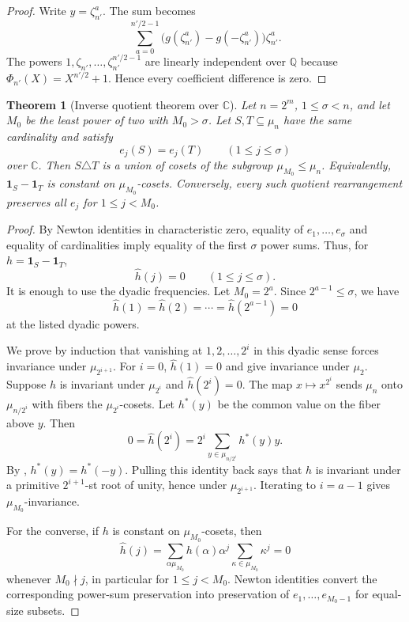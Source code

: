 \documentclass[11pt]{article}
\newtheorem{theorem}{Theorem}[section]
\theoremstyle{definition}
\newcommand{\Q}{\mathbb Q}
\newcommand{\C}{\mathbb C}
\begin{document}
\begin{proof}
Write $y=\zeta_{n'}^a$.  The sum becomes
\[
        \sum_{a=0}^{n'/2-1}\big(g(\zeta_{n'}^a)-g(-\zeta_{n'}^a)\big)\zeta_{n'}^a.
\]
The powers $1,\zeta_{n'},\ldots,\zeta_{n'}^{n'/2-1}$ are linearly independent over $\Q$ because $\Phi_{n'}(X)=X^{n'/2}+1$.  Hence every coefficient difference is zero.
\end{proof}

\begin{theorem}[Inverse quotient theorem over $\C$]\label{thm:upstairs}
Let $n=2^m$, $1\le\sigma<n$, and let $M_0$ be the least power of two with $M_0>\sigma$.  Let $S,T\subseteq\mu_n$ have the same cardinality and satisfy
\[
        e_j(S)=e_j(T)\qquad(1\le j\le\sigma)
\]
over $\C$.  Then $S\triangle T$ is a union of cosets of the subgroup $\mu_{M_0}\le\mu_n$.  Equivalently, $\mathbf 1_S-\mathbf 1_T$ is constant on $\mu_{M_0}$-cosets.  Conversely, every such quotient rearrangement preserves all $e_j$ for $1\le j<M_0$.
\end{theorem}

\begin{proof}
By Newton identities in characteristic zero, equality of $e_1,\ldots,e_\sigma$ and equality of cardinalities imply equality of the first $\sigma$ power sums.  Thus, for $h=\mathbf 1_S-\mathbf 1_T$,
\[
        \widehat h(j)=0\qquad(1\le j\le\sigma).
\]
It is enough to use the dyadic frequencies.  Let $M_0=2^a$.  Since $2^{a-1}\le\sigma$, we have
\[
        \widehat h(1)=\widehat h(2)=\cdots=\widehat h(2^{a-1})=0
\]
at the listed dyadic powers.

We prove by induction that vanishing at $1,2,\ldots,2^i$ in this dyadic sense forces invariance under $\mu_{2^{i+1}}$.  For $i=0$, $\widehat h(1)=0$ and  give invariance under $\mu_2$.  Suppose $h$ is invariant under $\mu_{2^i}$ and $\widehat h(2^i)=0$.  The map $x\mapsto x^{2^i}$ sends $\mu_n$ onto $\mu_{n/2^i}$ with fibers the $\mu_{2^i}$-cosets.  Let $h^\ast(y)$ be the common value on the fiber above $y$.  Then
\[
        0=\widehat h(2^i)=2^i\sum_{y\in\mu_{n/2^i}}h^\ast(y)y.
\]
By , $h^\ast(y)=h^\ast(-y)$.  Pulling this identity back says that $h$ is invariant under a primitive $2^{i+1}$-st root of unity, hence under $\mu_{2^{i+1}}$.  Iterating to $i=a-1$ gives $\mu_{M_0}$-invariance.

For the converse, if $h$ is constant on $\mu_{M_0}$-cosets, then
\[
        \widehat h(j)=\sum_{\alpha\mu_{M_0}}h(\alpha)\alpha^j\sum_{\kappa\in\mu_{M_0}}\kappa^j=0
\]
whenever $M_0\nmid j$, in particular for $1\le j<M_0$.  Newton identities convert the corresponding power-sum preservation into preservation of $e_1,\ldots,e_{M_0-1}$ for equal-size subsets.
\end{proof}
\end{document}
